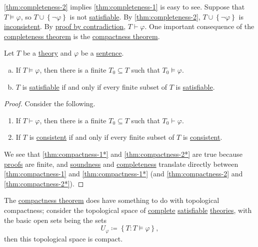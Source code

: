 \autoref{thm:completeness-2} implies \autoref{thm:completeness-1} is easy to see. Suppose that \(T \models \varphi \), so \(T \cup \left\{ \lnot \varphi  \right\} \) is not \hyperref[def:satisfiable]{satisfiable}. By \autoref{thm:completeness-2}, \(T \cup \left\{ \lnot \varphi  \right\} \) is \hyperref[def:inconsistent]{inconsistent}. By \hyperref[prop:proof-by-contradiction]{proof by contradiction}, \(T \vdash \varphi \). One important consequence of the \hyperref[thm:completeness]{completeness theorem} is the \hyperref[thm:compactness]{compactness theorem}.

\begin{theorem}[Compactness]\label{thm:compactness}
	Let \(T\) be a \hyperref[def:theory]{theory} and \(\varphi \) be a \hyperref[def:sentence]{sentence}.
	\begin{enumerate}[(a)]
		\item\label{thm:compactness-1} If \(T\models \varphi \), then there is a finite \(T_0 \subseteq T\) such that \(T_0 \models \varphi \).
		\item\label{thm:compactness-2} \(T\) is \hyperref[def:satisfiable]{satisfiable} if and only if every finite subset of \(T\) is \hyperref[def:satisfiable]{satisfiable}.
	\end{enumerate}
\end{theorem}
\begin{proof}
	Consider the following.
	\begin{enumerate}[(a*)]
		\item\label{thm:compactness-1*} If \(T\vdash \varphi \), then there is a finite \(T_0 \subseteq T\) such that \(T_0 \vdash \varphi \).
		\item\label{thm:compactness-2*} If \(T\) is \hyperref[def:consistent]{consistent} if and only if every finite subset of \(T\) is \hyperref[def:consistent]{consistent}.
	\end{enumerate}
	We see that \autoref{thm:compactness-1*} and \autoref{thm:compactness-2*} are true because \hyperref[def:proof]{proofs} are finite, and \hyperref[thm:soundness]{soundness} and \hyperref[thm:completeness]{completeness} translate directly between \autoref{thm:compactness-1} and \autoref{thm:compactness-1*} (and \autoref{thm:compactness-2} and \autoref{thm:compactness-2*}).
\end{proof}

\begin{remark}
	The \hyperref[thm:compactness]{compactness theorem} does have something to do with topological compactness; consider the topological space of \hyperref[def:complete]{complete} \hyperref[def:satisfiable]{satisfiable} \hyperref[def:theory]{theories}, with the basic open sets being the sets
	\[
		U_\varphi \coloneqq \left\{ T\colon T\models \varphi  \right\},
	\]
	then this topological space is compact.
\end{remark}


